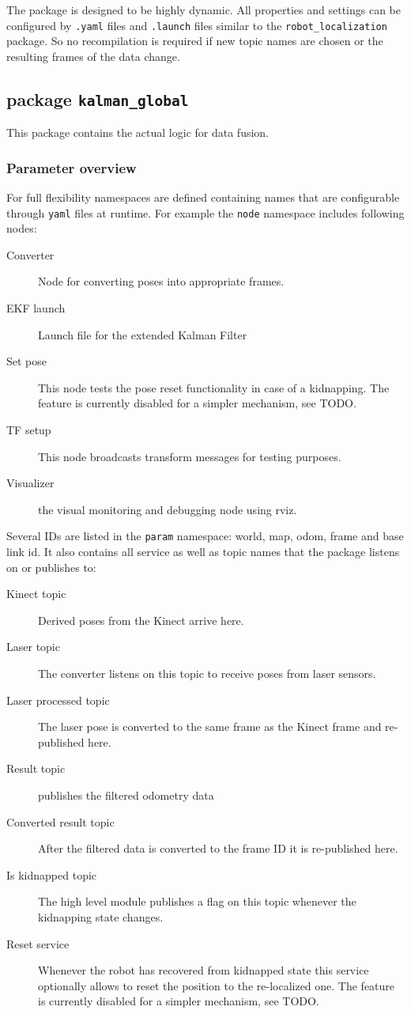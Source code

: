 The package is designed to be highly dynamic. All properties and settings can be configured by \texttt{.yaml} files and \texttt{.launch} files similar to the \texttt{robot\_localization} package. So no recompilation is required if new topic names are chosen or the resulting frames of the data change.

\subsection{package \texttt{kalman\_global}}
This package contains the actual logic for data fusion.

\subsubsection{Parameter overview}
For full flexibility namespaces are defined containing names that are configurable through \texttt{yaml} files at runtime. For example the \texttt{node} namespace includes following nodes:
\begin{description}
\item[Converter] Node for converting poses into appropriate frames.
\item[EKF launch] Launch file for the extended Kalman Filter
\item[Set pose] This node tests the pose reset functionality in case of a kidnapping. The feature is currently disabled for a simpler mechanism, see TODO.
\item[TF setup] This node broadcasts transform messages for testing purposes.
\item[Visualizer] the visual monitoring and debugging node using rviz.
\end{description}

Several IDs are listed in the \texttt{param} namespace: world, map, odom, frame and base link id. It also contains all service as well as topic names that the package listens on or publishes to:

\begin{description}
\item[Kinect topic] Derived poses from the Kinect arrive here.
\item[Laser topic] The converter listens on this topic to receive poses from laser sensors. 
\item[Laser processed topic] The laser pose is converted to the same frame as the Kinect frame and re-published here.
\item[Result topic] publishes the filtered odometry data
\item[Converted result topic] After the filtered data is converted to the frame ID it is re-published here.
\item[Is kidnapped topic] The high level module publishes a flag on this topic whenever the kidnapping state changes.
\item[Reset service] Whenever the robot has recovered from kidnapped state this service optionally allows to reset the position to the re-localized one. The feature is currently disabled for a simpler mechanism, see TODO.
\end{description}

